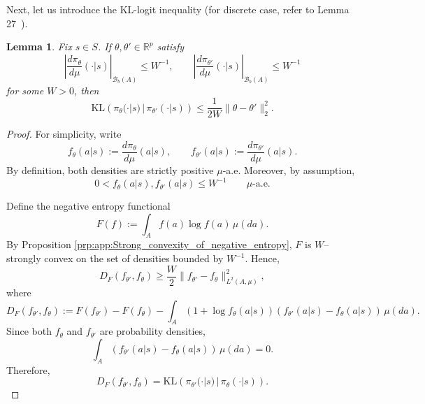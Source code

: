 \documentclass{amsart}
\newtheorem{lemma}[theorem]{Lemma}
\theoremstyle{definition}
\begin{document}
Next, let us introduce the KL-logit inequality (for discrete case, refer to Lemma 27~\cite{mei2020global}).
\begin{lemma}\label{lem:app:kl-logit_ineq_affine}
Fix $s\in S$. 
If $\theta,\theta' \in \mathbb{R}^p$ satisfy
\[
\left|
\frac{d\pi_\theta}{d\mu}(\cdot|s)
\right|_{\mathcal B_b( A)}
\le W^{-1},
\qquad
\left|
\frac{d\pi_{\theta'}}{d\mu}(\cdot|s)
\right|_{\mathcal B_b( A)}
\le W^{-1}
\]
for some $W>0$, then
\[
\mathrm{KL}\left(
\pi_\theta(\cdot|s)\,|\,\pi_{\theta'}(\cdot|s)
\right)
\le
\frac{1}{2W}\|\theta-\theta'\|_2^2 .
\]
\end{lemma}

\begin{proof}
For simplicity, write
\[
f_\theta(a|s):=\frac{d\pi_\theta}{d\mu}(a|s),
\qquad
f_{\theta'}(a|s):=\frac{d\pi_{\theta'}}{d\mu}(a|s).
\]
By definition, both densities are strictly positive $\mu$-a.e. Moreover,
by assumption,
\[
0<f_\theta(a|s),f_{\theta'}(a|s)\le W^{-1}
\qquad \mu\text{-a.e.}
\]

Define the negative entropy functional
\[
F(f):=\int_{ A} f(a)\log f(a)\,\mu(da).
\]
By Proposition \ref{prp:app:Strong_convexity_of_negative_entropy}, $F$ is
$W$--strongly convex on the set of densities bounded by $W^{-1}$. Hence,
\[
D_F(f_{\theta'},f_\theta)
\ge
\frac{W}{2}
\|f_{\theta'}-f_\theta\|_{L^2(A,\mu)}^2,
\]
where
\[
D_F(f_{\theta'},f_\theta)
:=
F(f_{\theta'})
-
F(f_\theta)
-
\int_{ A}
\left(1+\log f_\theta(a|s)\right)
\left(f_{\theta'}(a|s)-f_\theta(a|s)\right)
\,\mu(da).
\]
Since both $f_\theta$ and $f_{\theta'}$ are probability densities,
\[
\int_{ A}
\left(f_{\theta'}(a|s)-f_\theta(a|s)\right)\,\mu(da)=0.
\]
Therefore,
\[
D_F(f_{\theta'},f_\theta)
=
\mathrm{KL}\left(
\pi_{\theta'}(\cdot|s)\, |\,\pi_\theta(\cdot|s)
\right).
\]


\end{proof}
\end{document}
